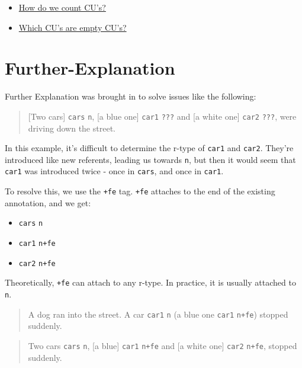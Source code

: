 \documentclass[
]{book}
\providecommand{\tightlist}{%
  \setlength{\itemsep}{0pt}\setlength{\parskip}{0pt}}
\begin{document}
\begin{itemize}
\tightlist
\item
  \protect\hyperlink{counting-cus}{How do we count CU's?}
\item
  \protect\hyperlink{empty-cus}{Which CU's are empty CU's?}
\end{itemize}

\hypertarget{further-explanation}{%
\section{Further-Explanation}\label{further-explanation}}

Further Explanation was brought in to solve issues like the following:

\begin{quote}
{[}Two cars{]} \texttt{cars} \texttt{n}, {[}a blue one{]} \texttt{car1} \texttt{???} and {[}a white one{]} \texttt{car2} \texttt{???}, were driving down the street.
\end{quote}

In this example, it's difficult to determine the r-type of \texttt{car1} and \texttt{car2}.
They're introduced like new referents, leading us towards \texttt{n}, but then it would seem that \texttt{car1} was introduced twice -
once in \texttt{cars}, and once in \texttt{car1}.

To resolve this, we use the \texttt{+fe} tag.
\texttt{+fe} attaches to the end of the existing annotation, and we get:

\begin{itemize}
\tightlist
\item
  \texttt{cars} \texttt{n}
\item
  \texttt{car1} \texttt{n+fe}
\item
  \texttt{car2} \texttt{n+fe}
\end{itemize}

Theoretically, \texttt{+fe} can attach to any r-type. In practice, it is usually attached to \texttt{n}.

\begin{quote}
A dog ran into the street. A car \texttt{car1} \texttt{n} (a blue one \texttt{car1} \texttt{n+fe}) stopped suddenly.
\end{quote}

\begin{quote}
Two cars \texttt{cars} \texttt{n},
{[}a blue{]} \texttt{car1} \texttt{n+fe} and {[}a white one{]} \texttt{car2} \texttt{n+fe},
stopped suddenly.
\end{quote}
\end{document}
